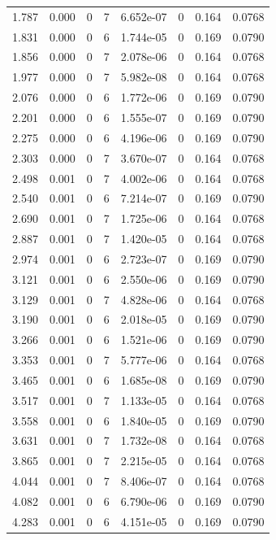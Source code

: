 \documentclass[preview]{standalone}
\begin{document}
{{\begin{tabular}{L{1.2cm}C{1.2cm} C{0.3cm}C{0.5cm} C{1.4cm}C{1.4cm} C{1.4cm}C{1.4cm}}
  1.787  &  0.000  & 0     &  7 &  6.652e-07  & 0  & 0.164 &  0.0768   \\ 
  1.831  &  0.000  & 0     &  6 &  1.744e-05  & 0  & 0.169 &  0.0790   \\ 
  1.856  &  0.000  & 0     &  7 &  2.078e-06  & 0  & 0.164 &  0.0768   \\ 
  1.977  &  0.000  & 0     &  7 &  5.982e-08  & 0  & 0.164 &  0.0768   \\ 
  2.076  &  0.000  & 0     &  6 &  1.772e-06  & 0  & 0.169 &  0.0790   \\ 
  2.201  &  0.000  & 0     &  6 &  1.555e-07  & 0  & 0.169 &  0.0790   \\ 
  2.275  &  0.000  & 0     &  6 &  4.196e-06  & 0  & 0.169 &  0.0790   \\ 
  2.303  &  0.000  & 0     &  7 &  3.670e-07  & 0  & 0.164 &  0.0768   \\ 
  2.498  &  0.001  & 0     &  7 &  4.002e-06  & 0  & 0.164 &  0.0768   \\ 
  2.540  &  0.001  & 0     &  6 &  7.214e-07  & 0  & 0.169 &  0.0790   \\ 
  2.690  &  0.001  & 0     &  7 &  1.725e-06  & 0  & 0.164 &  0.0768   \\ 
  2.887  &  0.001  & 0     &  7 &  1.420e-05  & 0  & 0.164 &  0.0768   \\ 
  2.974  &  0.001  & 0     &  6 &  2.723e-07  & 0  & 0.169 &  0.0790   \\ 
  3.121  &  0.001  & 0     &  6 &  2.550e-06  & 0  & 0.169 &  0.0790   \\ 
  3.129  &  0.001  & 0     &  7 &  4.828e-06  & 0  & 0.164 &  0.0768   \\ 
  3.190  &  0.001  & 0     &  6 &  2.018e-05  & 0  & 0.169 &  0.0790   \\ 
  3.266  &  0.001  & 0     &  6 &  1.521e-06  & 0  & 0.169 &  0.0790   \\ 
  3.353  &  0.001  & 0     &  7 &  5.777e-06  & 0  & 0.164 &  0.0768   \\ 
  3.465  &  0.001  & 0     &  6 &  1.685e-08  & 0  & 0.169 &  0.0790   \\ 
  3.517  &  0.001  & 0     &  7 &  1.133e-05  & 0  & 0.164 &  0.0768   \\ 
  3.558  &  0.001  & 0     &  6 &  1.840e-05  & 0  & 0.169 &  0.0790   \\ 
  3.631  &  0.001  & 0     &  7 &  1.732e-08  & 0  & 0.164 &  0.0768   \\ 
  3.865  &  0.001  & 0     &  7 &  2.215e-05  & 0  & 0.164 &  0.0768   \\ 
  4.044  &  0.001  & 0     &  7 &  8.406e-07  & 0  & 0.164 &  0.0768   \\ 
  4.082  &  0.001  & 0     &  6 &  6.790e-06  & 0  & 0.169 &  0.0790   \\ 
  4.283  &  0.001  & 0     &  6 &  4.151e-05  & 0  & 0.169 &  0.0790   \\ 
\hline 
\end{tabular} 

}}
\end{document}
